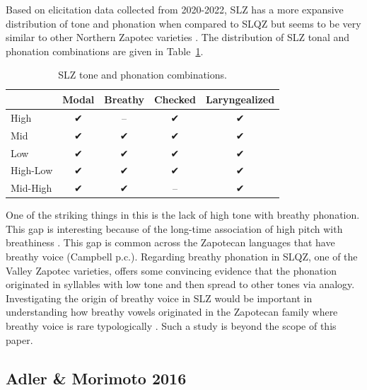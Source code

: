 \documentclass[12pt, letterpaper]{article}
\providecommand{\lsptoprule}{\midrule\toprule}
\providecommand{\lspbottomrule}{\bottomrule\midrule}
\begin{document}
Based on elicitation data collected from 2020-2022, SLZ has a more expansive distribution of tone and phonation when compared to SLQZ but seems to be very similar to other Northern Zapotec varieties \citep[e.g.,][]{avelinobecerraTopicsYalalagZapotec2004}. The distribution of SLZ tonal and phonation combinations are given in Table~\ref{tab:ToneVoiceQuality}.
\begin{table}[!h]
	\caption{SLZ tone and phonation combinations.}
	\label{tab:ToneVoiceQuality}
	\centering

	\begin{tabular}{lcccc}
	\lsptoprule
		& \textbf{Modal} & \textbf{Breathy} & \textbf{Checked} & \textbf{Laryngealized} \\
	\hline
	High		& ✔︎ & -- & ✔︎ & ✔︎ \\
	Mid			& ✔︎ & ✔︎ & ✔︎ & ✔︎ \\
	Low			& ✔︎ & ✔︎ & ✔︎ & ✔︎ \\
	High-Low	& ✔︎ & ✔︎ & ✔︎ & ✔︎ \\
	Mid-High	& ✔︎	& ✔︎ & -- & ✔︎ \\
	\lspbottomrule
	\end{tabular}
\end{table}

One of the striking things in this is the lack of high tone with breathy phonation. This gap is interesting because of the long-time association of high pitch with breathiness \citep[a good overview–of this association and other phonation types–is found in][]{eslingVoiceQualityLaryngeal2019}. This gap is common across the Zapotecan languages that have breathy voice (Campbell p.c.). Regarding breathy phonation in SLQZ, one of the Valley Zapotec varieties, \citet{uchiharaToneRegistrogenesisQuiavini2016} offers some convincing evidence that the phonation originated in syllables with low tone and then spread to other tones via analogy. Investigating the origin of breathy voice in SLZ would be important in understanding how breathy vowels originated in the Zapotecan family where breathy voice is rare typologically \citep{ariza-garciaPhonationTypesTones2018}. Such a study is beyond the scope of this paper.  

\subsection{Adler \& Morimoto 2016 } \label{sec:AM2016}
\end{document}
